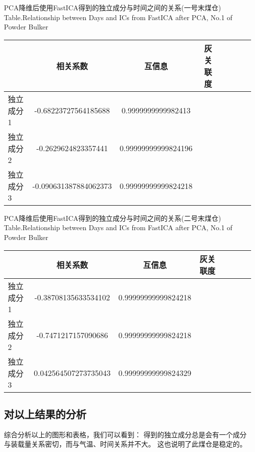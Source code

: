 \begin{table}[!htb]
\begin{center}
		{PCA降维后使用FastICA得到的独立成分与时间之间的关系(一号末煤仓)}
			{Table.}{Relationship between Days and ICs from FastICA after PCA, No.1 of Powder Bulker}
\begin{tabular}{lccclccc}
\toprule
                & 相关系数     					& 互信息      					&灰关联度 \\
\midrule
  独立成分1     &  -0.68223727564185688  	& 0.9999999999982413   		&    \\
  独立成分2     &  -0.2629624823357441	      	& 0.99999999999824196   	&    \\
  独立成分3     &  -0.090631387884062373	& 0.99999999999824218   	&    \\
 \bottomrule
\end{tabular}
\end{center}
\end{table}

\begin{table}[!htb]
\begin{center}
		{PCA降维后使用FastICA得到的独立成分与时间之间的关系(二号末煤仓)}
			{Table.}{Relationship between Days and ICs from FastICA after PCA, No.1 of Powder Bulker}
\begin{tabular}{lccclccc}
\toprule
                & 相关系数     					& 互信息      					&灰关联度 \\
\midrule
  独立成分1     &  -0.38708135633534102  	& 0.99999999999824218 		&    \\
  独立成分2     &  -0.7471217157090686	      	& 0.99999999999824218   	&    \\
  独立成分3     &  0.042564507273735043	& 0.99999999999824329   	&    \\
 \bottomrule
\end{tabular}
\end{center}
\end{table}

\subsection{对以上结果的分析}
综合分析以上的图形和表格，我们可以看到：
得到的独立成分总是会有一个成分与装载量关系密切，而与气温、时间关系并不大。
这也说明了此煤仓是稳定的。












